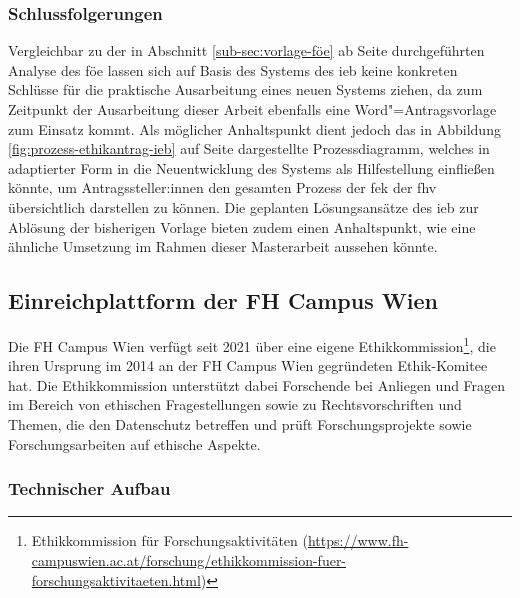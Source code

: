 \documentclass[a4paper,12pt,twoside]{scrreprt}
\begin{document}
\subsubsection*{Schlussfolgerungen}
\label{sub-sub-sec:schlussfolgerungen-fh-oö}

Vergleichbar zu der in Abschnitt \ref{sub-sec:vorlage-föe} ab Seite \pageref{sub-sec:vorlage-föe} durchgeführten Analyse des \ac{föe} lassen sich auf Basis des Systems des \ac{ieb} keine konkreten Schlüsse für die praktische Ausarbeitung eines neuen Systems ziehen, da zum Zeitpunkt der Ausarbeitung dieser Arbeit ebenfalls eine Word"=Antragsvorlage zum Einsatz kommt. Als möglicher Anhaltspunkt dient jedoch das in Abbildung \ref{fig:prozess-ethikantrag-ieb} auf Seite \pageref{fig:prozess-ethikantrag-ieb} dargestellte Prozessdiagramm, welches in adaptierter Form in die Neuentwicklung des Systems als Hilfestellung einfließen könnte, um Antragssteller:innen den gesamten Prozess der \ac{fek} der \ac{fhv} übersichtlich darstellen zu können. Die geplanten Lösungsansätze des \ac{ieb} zur Ablösung der bisherigen Vorlage bieten zudem einen Anhaltspunkt, wie eine ähnliche Umsetzung im Rahmen dieser Masterarbeit aussehen könnte.

\subsection{Einreichplattform der FH Campus Wien}
\label{sub-sec:einreichplattform-fh-campus-wien}

Die FH Campus Wien verfügt seit 2021 über eine eigene Ethikkommission\footnote{Ethikkommission für Forschungsaktivitäten (\url{https://www.fh-campuswien.ac.at/forschung/ethikkommission-fuer-forschungsaktivitaeten.html})}, die ihren Ursprung im 2014 an der FH Campus Wien gegründeten Ethik-Komitee hat. Die Ethikkommission unterstützt dabei Forschende bei Anliegen und Fragen im Bereich von ethischen Fragestellungen sowie zu Rechtsvorschriften und Themen, die den Datenschutz betreffen und prüft Forschungsprojekte sowie Forschungsarbeiten auf ethische Aspekte. \cite{fh_campus_wien_ethikkommission_2023}

\subsubsection*{Technischer Aufbau}
\label{sub-sub-sec:fh-cw-technischer-aufbau}
\end{document}
